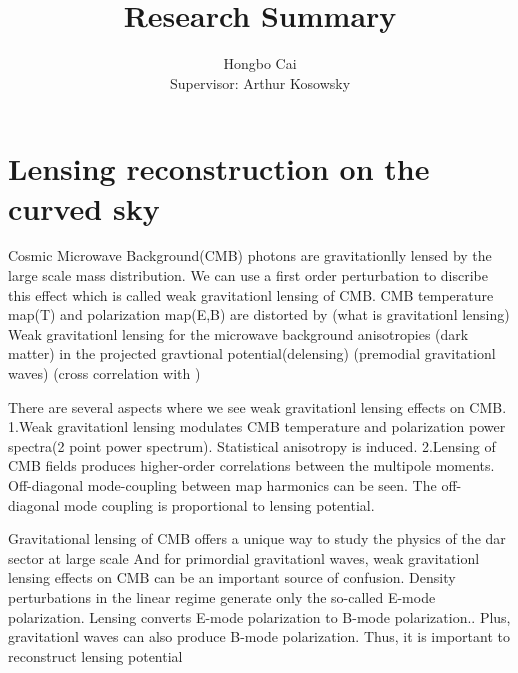 \documentclass[12pt, notitlepage, onecolumn, amsmath, amssymb, aps]{revtex4-1}
\title{}
\begin{document}
\title{Research Summary}
\author{Hongbo Cai \\{\small Supervisor: Arthur Kosowsky}}
\maketitle
\newcommand{\edit}[1]{\textcolor{red}{(#1)}}
\vspace{-1.5cm}
\section{Lensing reconstruction on the curved sky}
\label{sec:org8852578}


Cosmic Microwave Background(CMB) photons are gravitationlly lensed by the large scale mass distribution. We can use a first order perturbation to discribe this effect which is called weak gravitationl lensing of CMB.
CMB temperature map(T) and polarization map(E,B) are distorted by 
(what is gravitationl lensing)
Weak gravitationl lensing for the microwave background anisotropies
(dark matter)
in the projected gravtional potential(delensing)
(premodial gravitationl waves)
(cross correlation with )

There are several aspects where we see weak gravitationl lensing effects on CMB.
1.Weak gravitationl lensing modulates CMB temperature and polarization power spectra(2 point power spectrum). Statistical anisotropy is induced.
2.Lensing of CMB fields produces higher-order correlations between the multipole moments. Off-diagonal mode-coupling between map harmonics can be seen. The off-diagonal mode coupling is proportional to lensing potential.\cite{Hu:2001kj}

Gravitational lensing of CMB offers a unique way to study the physics of the dar sector at large scale 
And for primordial gravitationl waves, weak gravitationl lensing effects on CMB can be an important source of confusion\cite{Lewis:2006fu}. Density perturbations in the linear regime generate only the so-called E-mode polarization\cite{Kamionkowski:1996ks}. Lensing converts E-mode polarization to B-mode polarization.\cite{Zaldarriaga:1998ar}. Plus, gravitationl waves can also produce B-mode polarization\cite{Hu:2000ee}. Thus, it is important to reconstruct lensing potential
\end{document}
